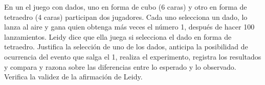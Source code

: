 \ejemplo

En un el juego con dados, uno en forma de cubo (6 caras) y otro en forma de tetraedro (4 caras) participan dos jugadores. Cada uno selecciona un dado, lo lanza al aire y gana quien obtenga más veces el número 1, después de hacer 100 lanzamientos. Leidy dice que ella juega si selecciona el dado en forma de tetraedro. Justifica la selección de uno de los dados, anticipa la posibilidad de ocurrencia del evento que salga el 1, realiza el experimento, registra los resultados y compara y razona sobre las diferencias entre lo esperado y lo observado. Verifica la validez de la afirmación de Leidy.

